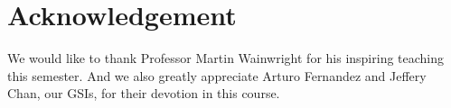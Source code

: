 \documentclass[preprint,12pt,3p]{elsarticle}
\begin{document}
\section{Acknowledgement}

We would like to thank Professor Martin Wainwright for his inspiring teaching this semester. And we also greatly appreciate Arturo Fernandez and Jeffery Chan, our GSIs, for their devotion in this course.

\newpage
\appendix
\tiny









% 
% 
% 
% 
% 
% 
% 
% 
% 
% 
% 
% 


\end{document}

